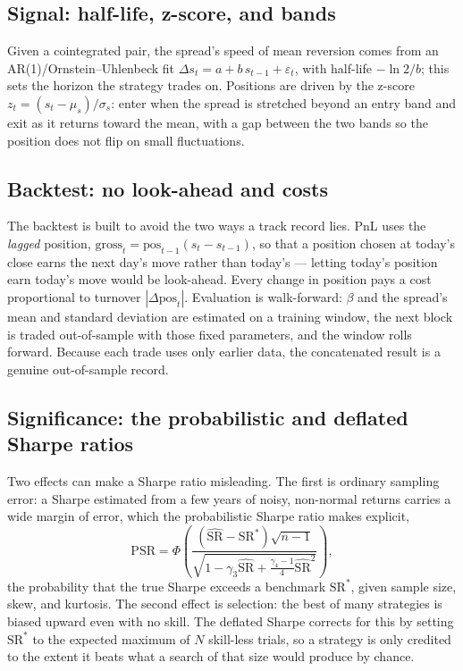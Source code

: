 \documentclass[11pt]{article}
\newcommand{\SR}{\mathrm{SR}}
\begin{document}
\subsection{Signal: half-life, z-score, and bands}
Given a cointegrated pair, the spread's speed of mean reversion comes from an AR(1)/Ornstein--Uhlenbeck fit
$\Delta s_t = a + b\,s_{t-1} + \varepsilon_t$, with half-life $-\ln 2 / b$; this sets the horizon the
strategy trades on. Positions are driven by the z-score $z_t = (s_t - \mu_s)/\sigma_s$: enter when the
spread is stretched beyond an entry band and exit as it returns toward the mean, with a gap between the two
bands so the position does not flip on small fluctuations.

\subsection{Backtest: no look-ahead and costs}
The backtest is built to avoid the two ways a track record lies. PnL uses the \emph{lagged} position,
$\text{gross}_t = \text{pos}_{t-1}(s_t - s_{t-1})$, so that a position chosen at today's close earns the
next day's move rather than today's --- letting today's position earn today's move would be look-ahead.
Every change in position pays a cost proportional to turnover $|\Delta \text{pos}_t|$. Evaluation is
walk-forward: $\beta$ and the spread's mean and standard deviation are estimated on a training window, the
next block is traded out-of-sample with those fixed parameters, and the window rolls forward. Because each
trade uses only earlier data, the concatenated result is a genuine out-of-sample record.

\subsection{Significance: the probabilistic and deflated Sharpe ratios}
Two effects can make a Sharpe ratio misleading. The first is ordinary sampling error: a Sharpe estimated
from a few years of noisy, non-normal returns carries a wide margin of error, which the probabilistic
Sharpe ratio makes explicit,
$$\mathrm{PSR}=\Phi\!\left(\frac{(\widehat{\SR}-\SR^{*})\sqrt{n-1}}
{\sqrt{1-\gamma_3\widehat{\SR}+\tfrac{\gamma_4-1}{4}\widehat{\SR}^2}}\right),$$
the probability that the true Sharpe exceeds a benchmark $\SR^{*}$, given sample size, skew, and kurtosis.
The second effect is selection: the best of many strategies is biased upward even with no skill. The
deflated Sharpe corrects for this by setting $\SR^{*}$ to the expected maximum of $N$ skill-less trials, so
a strategy is only credited to the extent it beats what a search of that size would produce by chance.
\end{document}
